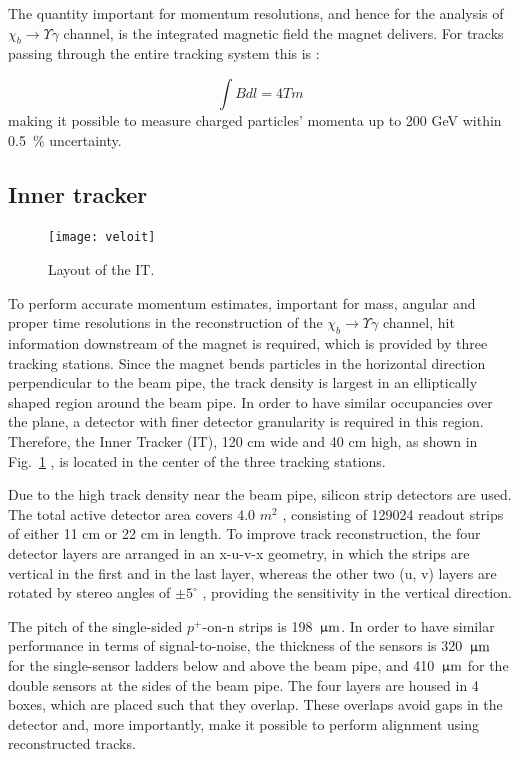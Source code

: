 The quantity important for momentum resolutions, and hence for the analysis
of $\chi_b \rightarrow \Upsilon \gamma$ channel, is the integrated magnetic field
the magnet delivers. For tracks passing through the entire tracking system this is
\cite{Alves:2008zz}:   

$$ \int Bdl = 4 Tm $$
making it possible to measure charged particles’ momenta up to 200 GeV within 0.5~\%
uncertainty.

\subsection{Inner tracker}

\begin{figure}[tb]
\begin{center}
\texttt{[image: veloit]}
\end{center}
\caption{\small Layout of the IT.}
\label{fig:veloit}
\end{figure}

To perform accurate momentum estimates, important for mass, angular and proper
time resolutions in the reconstruction of the 
$\chi_b \rightarrow \Upsilon \gamma$ channel, hit information downstream
of the magnet is required, which is provided by three tracking stations. Since 
the magnet bends particles in the horizontal direction perpendicular to the
beam pipe, the track density is largest in an elliptically shaped region around
the beam pipe. In order to have similar occupancies over the plane, a detector 
with finer detector granularity is required in this region. 
Therefore, the Inner Tracker (IT), 120 cm wide and 40 cm high, as shown in
Fig.~\ref{fig:veloit} , is located in the center of the three tracking stations.



Due to the high track density near the beam pipe, silicon strip detectors 
are used. The total active detector area covers 4.0 $m^2$ , consisting of 129024
readout strips of either 11 cm or 22 cm in length. To improve track
reconstruction, the four detector layers are arranged in an x-u-v-x geometry, 
in which the strips are vertical in the first and in the last layer, whereas the
other two (u, v) layers are rotated by stereo angles of $\pm5^\circ$ , providing the
sensitivity in the vertical direction.

The pitch of the single-sided $p^+$-on-n strips is 198 $\,\upmu\rm m$. In order to have
similar performance in terms of signal-to-noise, the thickness of the sensors
is 320 $\,\upmu\rm m$ for the single-sensor ladders below and above the beam pipe, and
410 $\,\upmu\rm m$ for the double sensors at the sides of the beam pipe. The four layers
are housed in 4 boxes, which are placed such that they overlap. These overlaps
avoid gaps in the detector and, more importantly, make it possible to perform
alignment using reconstructed tracks.




